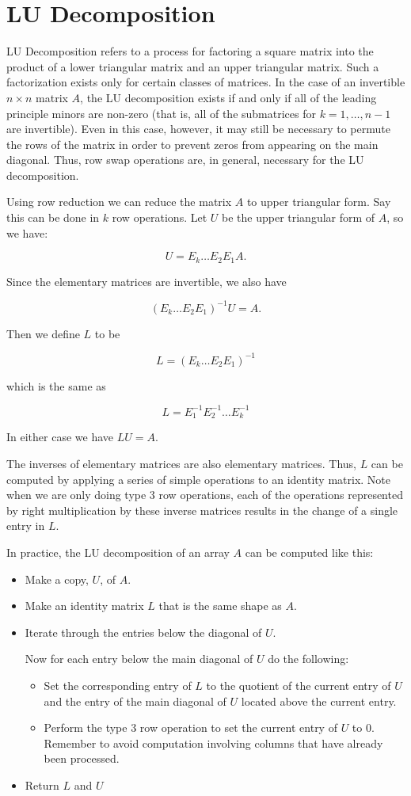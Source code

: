 \section*{LU Decomposition}
LU Decomposition refers to a process for factoring a square matrix into the product of a lower triangular matrix and an upper triangular matrix. Such a factorization exists only for certain classes of matrices. In the case of an invertible $n \times n$ matrix $A$, the LU decomposition exists if and only if all of the leading principle minors are non-zero (that is, all of the submatrices  for $k = 1,\ldots,n-1$ are invertible). Even in this case, however, it may still be necessary to permute the rows of the matrix in order to prevent zeros from appearing on the main diagonal. Thus, row swap operations are, in general, necessary for the LU decomposition.

Using row reduction we can reduce the matrix $A$ to upper triangular form. Say this can be done in $k$ row operations.
Let $U$ be the upper triangular form of $A$, so we have:

\[
U = E_k \dots E_2 E_1 A.
\]

Since the elementary matrices are invertible, we also have

\[
(E_k \dots E_2 E_1)^{-1} U =  A.
\]

Then we define $L$ to be

\[
L = (E_k \dots E_2 E_1)^{-1}
\]

which is the same as

\[
L = E_1^{-1} E_2^{-1} \dots E_k^{-1}
\]

In either case we have $L U = A$.

The inverses of elementary matrices are also elementary matrices. Thus, $L$ can be computed by applying a series of simple operations to an identity matrix.
Note when we are only doing type 3 row operations, each of the operations represented by right multiplication by these inverse matrices results in the change of a single entry in $L$.

In practice, the LU decomposition of an array $A$ can be computed like this:

\begin{itemize}
\item Make a copy, $U$, of $A$.
\item Make an identity matrix $L$ that is the same shape as $A$.
\item Iterate through the entries below the diagonal of $U$.

Now for each entry below the main diagonal of $U$ do the following:
	\begin{itemize}
	\item Set the corresponding entry of $L$ to the quotient of the current entry of $U$ and the entry of the main diagonal of $U$ located above the current entry.
	\item Perform the type 3 row operation to set the current entry of $U$ to 0.
		Remember to avoid computation involving columns that have already been processed.
	\end{itemize}
\item Return $L$ and $U$
\end{itemize}

